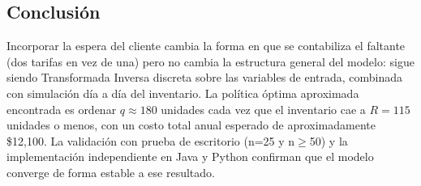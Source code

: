 \subsection{Conclusión}

Incorporar la espera del cliente cambia la forma en que se contabiliza el faltante (dos tarifas en vez de una) pero no cambia la estructura general del modelo: sigue siendo Transformada Inversa discreta sobre las variables de entrada, combinada con simulación día a día del inventario. La política óptima aproximada encontrada es ordenar $q \approx 180$ unidades cada vez que el inventario cae a $R=115$ unidades o menos, con un costo total anual esperado de aproximadamente \$12,100. La validación con prueba de escritorio (n=25 y n$\geq$50) y la implementación independiente en Java y Python confirman que el modelo converge de forma estable a ese resultado.
